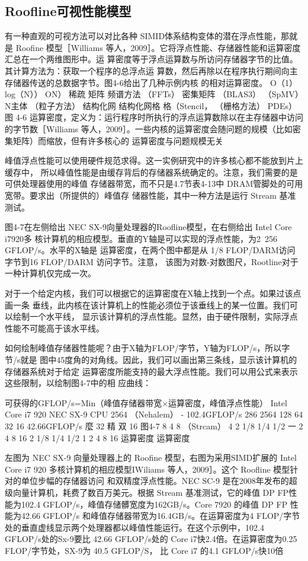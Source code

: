 \subsection{Roofline可视性能模型}
有一种直观的可视方法可以对比各种 SIMID体系结构变体的潜在浮点性能，那就是 Roofine
模型［Williams 等人，2009］。它将浮点性能、存储器性能和运算密度汇总在一个两维图形中。运
算密度等于浮点运算数与所访问存储器字节的比值。其计算方法为：获取一个程序的总浮点运
算数，然后再除以在程序执行期间向主存储器传送的总数据字节。图4-6给出了几种示例内核
的相对运算密度。
O（1）
log（N））
ON）
稀疏
矩阵
频谱方法
（FFTs）
密集矩阵
（BLAS3）
（SpMV）
N主体
（粒子方法）
结构化网
结构化网格
格（Stencil，
（栅格方法）
PDEs）
图 4-6
运算密度，定义为：运行程序时所执行的浮点运算数除以在主存储器中访问的字节数［Williams
等人，2009］。一些内核的运算密度会随问题的规模（比如密集矩阵）而缩放，但有许多核心的
运算密度与问题规模无关

峰值浮点性能可以使用硬件规范求得。这一实例研究中的许多核心都不能放到片上缓存中，
所以峰值性能是由缓存背后的存储器系统确定的。注意，我们需要的是可供处理器使用的峰值
存储器带宽，而不只是4.7节表4-13中 DRAM管脚处的可用宽带。要求出（所提供的）峰值存
储器性能，其中一种方法是运行 Stream 基准测试。

图4-7在左侧给出 NEC SX-9向量处理器的Roofline模型，在右侧给出 Intel Core i7920多
核计算机的相应模型。垂直的Y轴是可以实现的浮点性能，为2~256 GFLOP/s。水平的X轴是
运算密度，在两个图中都是从 1/8 FLOP/DARM访问字节到16 FLOP/DARM 访问字节。注意，
该图为对数-对数图尺，Rootline对于一种计算机仅完成一次。

对于一个给定内核，我们可以根据它的运算密度在X轴上找到一个点。如果过该点画一条
垂线，此内核在该计算机上的性能必须位于该垂线上的某一位置。我们可以绘制一个水平线，
显示该计算机的浮点性能。显然，由于硬件限制，实际浮点性能不可能高于该水平线。

如何绘制峰值存储器性能呢？由于X轴为FLOP/字节，Y轴为FLOP/s，所以字节/s就是
图中45度角的对角线。因此，我们可以画出第三条线，显示该计算机的存储器系统对于给定
运算密度所能支持的最大浮点性能。我们可以用公式来表示这些限制，以绘制图4-7中的相
应曲线：

可获得的GFLOP/s=Min（峰值存储器带宽×运算密度，峰值浮点性能）
Intel Core i7 920
NEC SX-9 CPU
2564
（Nehalem）
- 102.4GFLOP/s
286
2564
128
64
32
16
42.66GFLOP/s
麼 32
精
双 16
图4-7
8
4
8
（Strcam）
4
2
1/8
1/4 1/2
一
2 4
8
16
2
1/8
1/4 1/2
1
2
4
8
16
运算密度
运算密度

左图为 NEC SX-9 向量处理器上的 Roofine 模型，右图为采用SIMD扩展的 Intel Core i7 920
多核计算机的相应模型IWiliams 等人，2009］。这个 Roofline 模型针对的单位步幅的存储器访问
和双精度浮点性能。NEC SC-9 是在2008年发布的超级向量计算机，耗费了数百万美元。根据
Stream 基准测试，它的峰值 DP FP性能为102.4 GFLOP/s，峰值存储髒宽度为162GB/s。Core 7920
的峰值 DP FP 性能为42.66 GFLOP/s 和峰值存储器带宽为16.4GB/s。在运算密度为4 FLOP/字节
处的垂直虚线显示两个处理器都以峰值性能运行。在这个示例中，102.4 GFLOP/s处的Sx-9要比
42.66 GFLOP/s处的 Core i7快2.4倍。在运算密度为0.25 FLOP/字节处，SX-9为 40.5 GFLOP/S，
比 Core i7 的4.1 GFLOP/s快10倍


